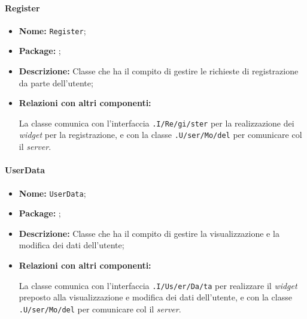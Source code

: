 \paragraph{Register}
\begin{flushleft}
\begin{itemize}
\item \textbf{Nome:} \texttt{Register};
\item \textbf{Package:} \texttt{\logicUser};
\item \textbf{Descrizione:} Classe che ha il compito di gestire le richieste di registrazione da parte dell'utente;
\item \textbf{Relazioni con altri componenti:}
\begin{sloppypar}
La classe comunica con l'interfaccia \texttt{\viewUser{}.I\fshyp{}Re\fshyp{}gi\fshyp{}ster} per la realizzazione dei \textit{widget} per la registrazione, e con la classe \texttt{\model{}.U\fshyp{}ser\fshyp{}Mo\fshyp{}del} per comunicare col il \textit{server}.
\end{sloppypar}
\end{itemize}
\end{flushleft}

\paragraph{UserData}
\begin{flushleft}
\begin{itemize}
\item \textbf{Nome:} \texttt{UserData};
\item \textbf{Package:} \texttt{\logicUser};
\item \textbf{Descrizione:} Classe che ha il compito di gestire la visualizzazione e la modifica dei dati dell'utente;
\item \textbf{Relazioni con altri componenti:}
\begin{sloppypar}
La classe comunica con l'interfaccia \texttt{\viewUser{}.I\fshyp{}Us\fshyp{}er\fshyp{}Da\fshyp{}ta} per realizzare il \textit{widget} preposto alla visualizzazione e modifica dei dati dell'utente, e con la classe \texttt{\model{}.U\fshyp{}ser\fshyp{}Mo\fshyp{}del} per comunicare col il \textit{server}.
\end{sloppypar}
\end{itemize}
\end{flushleft}

